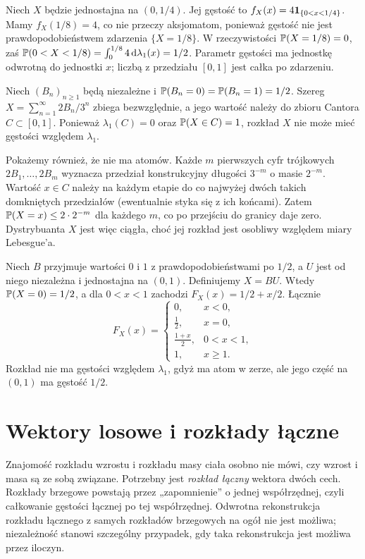 \begin{przyklad}
Niech $X$ będzie jednostajna na $(0,1/4)$. Jej gęstość
to $f_X(x)=4\mathbf{1}_{\{0<x<1/4\}}$. Mamy $f_X(1/8)=4$,
co nie przeczy aksjomatom, ponieważ gęstość nie jest
prawdopodobieństwem zdarzenia $\{X=1/8\}$.
W rzeczywistości $\mathbb{P}(X=1/8)=0$, zaś
$\mathbb{P}(0<X<1/8)=\int_0^{1/8}4\,\mathrm{d}\lambda_1(x)=1/2$.
Parametr gęstości ma jednostkę odwrotną do jednostki $x$;
liczbą z przedziału $[0,1]$ jest całka po zdarzeniu.
\end{przyklad}

\begin{przyklad}
Niech $(B_n)_{n\geq1}$ będą niezależne i
$\mathbb{P}(B_n=0)=\mathbb{P}(B_n=1)=1/2$. Szereg
$X=\sum_{n=1}^\infty 2B_n/3^n$ zbiega bezwzględnie,
a jego wartość należy do zbioru Cantora $C\subset[0,1]$.
Ponieważ $\lambda_1(C)=0$ oraz $\mathbb{P}(X\in C)=1$,
rozkład $X$ nie może mieć gęstości względem $\lambda_1$.

Pokażemy również, że nie ma atomów. Każde $m$ pierwszych
cyfr trójkowych $2B_1,\ldots,2B_m$ wyznacza przedział
konstrukcyjny długości $3^{-m}$ o masie $2^{-m}$.
Wartość $x\in C$ należy na każdym etapie do co najwyżej
dwóch takich domkniętych przedziałów (ewentualnie styka się
z ich końcami). Zatem $\mathbb{P}(X=x)\leq2\cdot2^{-m}$
dla każdego $m$, co po przejściu do granicy daje zero.
Dystrybuanta $X$ jest więc ciągła, choć jej rozkład
jest osobliwy względem miary Lebesgue'a.
\end{przyklad}

\begin{przyklad}
Niech $B$ przyjmuje wartości $0$ i $1$ z prawdopodobieństwami po $1/2$,
a $U$ jest od niego niezależna i jednostajna na $(0,1)$.
Definiujemy $X=BU$. Wtedy $\mathbb{P}(X=0)=1/2$, a dla $0<x<1$
zachodzi $F_X(x)=1/2+x/2$. Łącznie
\[
F_X(x)=\begin{cases}
0,&x<0,\\
\frac12,&x=0,\\
\frac{1+x}{2},&0<x<1,\\
1,&x\geq1.
\end{cases}
\]
Rozkład nie ma gęstości względem $\lambda_1$, gdyż ma atom w zerze,
ale jego część na $(0,1)$ ma gęstość $1/2$.
\end{przyklad}

\section{Wektory losowe i rozkłady łączne}
Znajomość rozkładu wzrostu i rozkładu masy ciała osobno nie
mówi, czy wzrost i masa są ze sobą związane. Potrzebny jest
\emph{rozkład łączny} wektora dwóch cech. Rozkłady brzegowe
powstają przez „zapomnienie” o jednej współrzędnej, czyli
całkowanie gęstości łącznej po tej współrzędnej. Odwrotna
rekonstrukcja rozkładu łącznego z samych rozkładów brzegowych
na ogół nie jest możliwa; niezależność stanowi szczególny
przypadek, gdy taka rekonstrukcja jest możliwa przez iloczyn.

